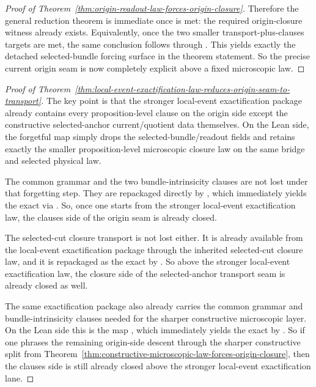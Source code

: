 \begin{proof}[Proof of Theorem~\ref{thm:origin-readout-law-forces-origin-closure}]
Therefore the general reduction theorem
 is
immediate once  is met: the required
origin-closure witness already exists. Equivalently, once the two smaller
transport-plus-clauses targets are met, the same conclusion follows through
.
This yields exactly the detached selected-bundle forcing surface in the
theorem statement. So the precise current origin seam is now completely
explicit above a fixed microscopic law.
\end{proof}

\begin{proof}[Proof of Theorem~\ref{thm:local-event-exactification-law-reduces-origin-seam-to-transport}]
\label{proof:thm:local-event-exactification-law-reduces-origin-seam-to-transport}
The key point is that the stronger local-event exactification package already
contains every proposition-level clause on the origin side except the
constructive selected-anchor current/quotient data themselves. On the Lean side, the
forgetful map
simply drops the selected-bundle/readout fields and retains exactly the
smaller proposition-level microscopic closure law on the same bridge and
selected physical law.

The common grammar and the two bundle-intrinsicity clauses are not lost under
that forgetting step. They are repackaged directly by
,
which immediately yields the exact
 via
. So, once one
starts from the stronger local-event exactification law, the clauses side of
the origin seam is already closed.

The selected-cut closure transport is not lost either. It is already available
from the local-event exactification package through the inherited selected-cut
closure law, and it is repackaged as the exact
 by
. So above the
stronger local-event exactification law, the closure side of the selected-anchor
transport seam is already closed as well.

The same exactification package also already carries the common grammar and
bundle-intrinsicity clauses needed for the sharper constructive microscopic
layer. On the Lean side this is the map
,
which immediately yields the exact
 by
.
So if one phrases the remaining origin-side descent through the sharper
constructive split from Theorem~\ref{thm:constructive-microscopic-law-forces-origin-closure},
then the clauses side is still already closed above the stronger
local-event exactification lane.


\end{proof}
